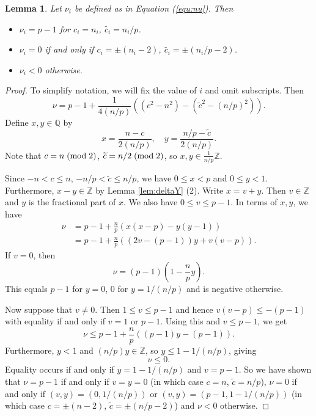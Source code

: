 \documentclass{amsart}
\newtheorem{lemma}[theorem]{Lemma}
\theoremstyle{definition}
\theoremstyle{remark}
\numberwithin{equation}{section}
\begin{document}
\begin{lemma}\label{lem:nu1}
Let $\nu_i$ be defined as in Equation (\ref{equ:nu}). Then
\begin{itemize}
\item[(1)]{$\nu_i = p-1$ for $c_i = n_i$, $\widetilde{c_i} = n_i/p$.}
\item[(2)]{$\nu_i = 0$ if and only if $c_i = \pm( n_i - 2)$, $\widetilde{c_i} = \pm ( n_i/p - 2)$.}
\item[(3)]{$\nu_i < 0$ otherwise.}
\end{itemize}

\end{lemma}
\begin{proof}
To simplify notation, we will fix the value of $i$ and omit subscripts. Then 
\[
\nu = p-1 + \frac{1}{4(n/p)}\left(  (c^2 - n^2) - (\widetilde{c}^2 - (n/p)^2 ) \right).
\]
Define $x,y \in \mathbb{Q}$ by
\[
x = \frac{n - c}{2(n/p)}, \quad y = \frac{ n/p - \widetilde{c} }{2(n/p)}.
\]
Note that $c = n \; ({\rm mod} \; 2)$, $\widetilde{c} = n/2 \; ({\rm mod} \; 2)$, so $x,y \in \frac{1}{n/p} \mathbb{Z}$. 

Since $-n < c \le n$, $-n/p < \widetilde{c} \le n/p$, we have $0 \le x < p$ and $0 \le y < 1$. Furthermore, $x-y \in \mathbb{Z}$ by Lemma \ref{lem:deltaY} (2). Write $x = v + y$. Then $v \in \mathbb{Z}$ and $y$ is the fractional part of $x$. We also have $0 \le v \le p-1$. In terms of $x,y$, we have
\begin{align*}
\nu &= p-1 + \frac{n}{p}\left( x(x-p) - y(y-1) \right) \\
&= p-1 + \frac{n}{p}\left( (2v-(p-1))y + v(v-p) \right).
\end{align*}
If $v=0$, then
\[
\nu = (p-1)\left( 1 - \frac{n}{p}y \right).
\]
This equals $p-1$ for $y=0$, $0$ for $y = 1/(n/p)$ and is negative otherwise.

Now suppose that $v \neq 0$. Then $1 \le v \le p-1$ and hence $v(v-p) \le -(p-1)$ with equality if and only if $v=1$ or $p-1$. Using this and $v \le p-1$, we get
\[
\nu \le p-1 + \frac{n}{p}\left( (p-1)y - (p-1) \right).
\]
Furthermore, $y < 1$ and $(n/p)y \in \mathbb{Z}$, so $y \le 1 - 1/(n/p)$, giving
\[
\nu \le 0.
\]
Equality occurs if and only if $y = 1 - 1/(n/p)$ and $v = p-1$. So we have shown that $\nu = p-1$ if and only if $v=y=0$ (in which case $c=n$, $\widetilde{c} = n/p$), $\nu = 0$ if and only if $(v,y) = (0, 1/(n/p))$ or $(v,y) = (p-1 , 1-1/(n/p))$ (in which case $c = \pm(n-2)$, $\widetilde{c} = \pm (n/p-2)$) and $\nu < 0$ otherwise. 

\end{proof}
\end{document}
